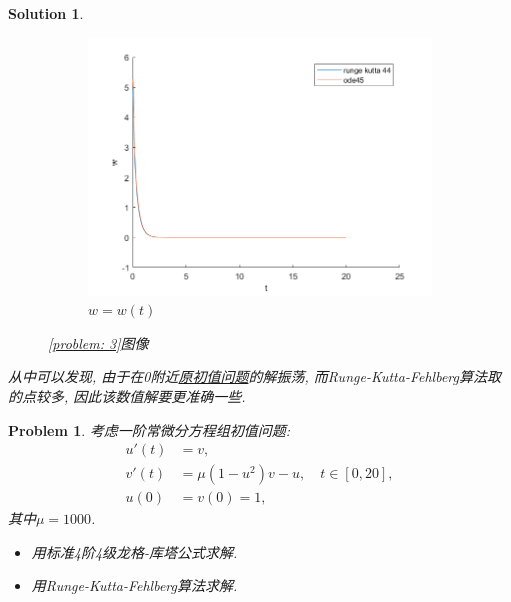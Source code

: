 \documentclass[a4paper, 12pt]{ctexart}
\theoremstyle{plain}
\newtheorem{problem}{Problem}[section]
\theoremstyle{plain}
\theoremstyle{plain}
\theoremstyle{nonumberplain}
\newtheorem{solution}{Solution}
\begin{document}
\begin{solution}
\begin{figure}[H]
            \begin{subfigure}[b]{0.3\textwidth}
                \centering
                \includegraphics[width=\textwidth]{wc33.png}
                \caption{$w=w(t)$}
            \end{subfigure}
            \caption{\ref{problem: 3}图像}
       \end{figure}
       从中可以发现, 由于在0附近\hyperref[equation: problem3]{原初值问题}的解振荡, 而Runge-Kutta-Fehlberg算法取的点较多, 因此该数值解要更准确一些.
    \end{solution}

    \begin{problem}
        \label{problem: 4}
        考虑一阶常微分方程组初值问题:
        \begin{equation}
            \label{equation: problem4}
            \begin{aligned}
                u'(t) &= v,\\
                v'(t) &= \mu(1-u^{2})v-u,\quad t\in [0, 20],\\
                u(0) &= v(0) = 1,
            \end{aligned}
        \end{equation}
        其中$\mu=1000$.
        \begin{itemize}
            \item 用标准4阶4级龙格-库塔公式求解.
            \item 用Runge-Kutta-Fehlberg算法求解.
        \end{itemize}
    \end{problem}
\end{document}
